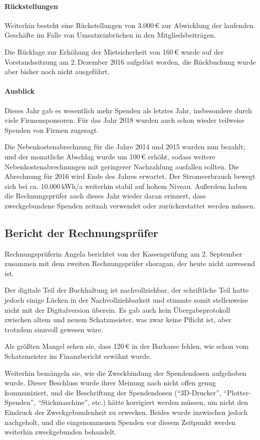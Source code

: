 \documentclass{s0minutes}
\begin{document}
\paragraph{Rückstellungen}
Weiterhin besteht eine Rückstellungen von 3{.}000\,€ zur Abwicklung der
laufenden Geschäfte im Falle von Umsatzeinbrüchen in den Mitgliedsbeiträgen.

Die Rücklage zur Erhöhung der Mietsicherheit von 160\,€ wurde auf der
Vorstandssitzung am 2.\,Dezember 2016 aufgelöst worden, die Rückbuchung wurde
aber bisher noch nicht ausgeführt.

\paragraph{Ausblick}
Dieses Jahr gab es wesentlich mehr Spenden als letztes Jahr, insbesondere durch
viele Firmensponsoren. Für das Jahr 2018 wurden auch schon wieder teilweise
Spenden von Firmen zugesagt.

Die Nebenkostenabrechnung für die Jahre 2014 und 2015 wurden nun bezahlt; und
der monatliche Abschlag wurde um 100\,€ erhöht, sodass weitere
Nebenkostenabrechnungen mit geringerer Nachzahlung ausfallen sollten. Die
Abrechnung für 2016 wird Ende des Jahres erwartet.
Der Stromverbrauch bewegt sich bei ca. 10{.}000\,kWh/a weiterhin stabil auf hohem
Niveau. Außerdem haben die Rechnungsprüfer auch dieses Jahr wieder daran
erinnert, dass zweckgebundene Spenden zeitnah verwendet oder zurückerstattet
werden müssen.

\subsection{Bericht der Rechnungsprüfer}

Rechnungsprüferin Angela berichtet von der Kassenprüfung am 2. September
zusammen mit dem zweiten Rechnungsprüfer shoragan, der heute nicht anwesend ist.

Der digitale Teil der Buchhaltung ist nachvollziehbar, der schriftliche Teil
hatte jedoch einige Lücken in der Nachvollziehbarkeit und stimmte somit
stellenweise nicht mit der Digitalversion überein. Es gab auch kein
Übergabeprotokoll zwischen altem und neuem Schatzmeister, was zwar keine Pflicht
ist, aber trotzdem sinnvoll gewesen wäre.

Als größten Mangel sehen sie, dass 120\,€ in der Barkasse fehlen, wie schon vom
Schatzmeister im Finanzbericht erwähnt wurde.

Weiterhin bemängeln sie, wie die Zweckbindung der Spendendosen aufgehoben wurde.
Dieser Beschluss wurde ihrer Meinung nach nicht offen genug kommuniziert, und
die Beschriftung der Spendendosen ("`3D-Drucker"', "`Plotter-Spenden"',
"`Stickmaschine"', etc.) hätte korrigiert werden müssen, um nicht den Eindruck
der Zweckgebundenheit zu erwecken. Beides wurde inzwischen jedoch nachgeholt,
und die eingenommenen Spenden vor diesem Zeitpunkt werden weiterhin
zweckgebunden behandelt.
\end{document}
